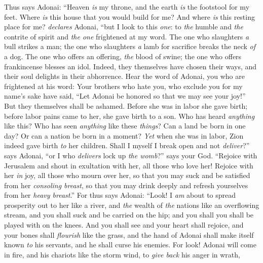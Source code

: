\begin{biblechapter} %
 Thus says Adonai:
\verse “Heaven \textit{is} my throne, 
and the earth \textit{is} the footstool for my feet. 
Where \textit{is} this house that you would build for me? 
And where \textit{is} this resting place for me? \textit{declares} Adonai, “but I look to this \textit{one}:
\verse to \textit{the} humble and \textit{the} contrite of spirit 
and \textit{the one} frightened at my word.
\verse The one who slaughters \textit{a} bull strikes a man; 
the one who slaughters \textit{a} lamb for sacrifice breaks the neck \textit{of} a dog. 
The one who offers an offering, \textit{the} blood of swine; 
the one who offers frankincense blesses an idol. 
Indeed, they themselves have chosen their ways, 
and their soul delights in their abhorrence.
\verse Hear the word of Adonai, you who are frightened at his word:
\verse Your brothers who hate you, 
who exclude you for my name’s sake have said, 
“Let Adonai be honored so that we may see your joy!” 
But they themselves shall be ashamed.
 Before she was in labor she gave birth; 
before labor pains came to her, she gave birth to a son.
\verse Who has heard \textit{anything} like this? 
Who has seen \textit{anything} like these \textit{things}? 
Can a land be born in one day? 
Or can a nation be born in a moment? \textit{Yet} when she was in labor, Zion indeed gave birth \textit{to} her children.
\verse Shall I myself I break open and not \textit{deliver}?” says Adonai, 
“or I who \textit{delivers} lock up \textit{the womb}?” says your God.
\verse “Rejoice with Jerusalem 
and shout in exultation with her, all those who love her! 
Rejoice with her \textit{in} joy, all those who mourn over her,
\verse so that you may suck and be satisfied from her \textit{consoling breast}, 
so that you may drink deeply and refresh yourselves from her \textit{heavy breast}.”
\verse For thus says Adonai:
\verse “Look! I \textit{am} about to spread prosperity out to her like a river, 
and \textit{the} wealth of \textit{the} nations like an overflowing stream, 
and you shall suck and be carried on the hip; 
and you shall you shall be played with on the knees.
 And you shall see and your heart shall rejoice, 
and your bones shall \textit{flourish} like the grass, 
and the hand of Adonai shall make itself known \textit{to} his servants, 
and he shall curse his enemies.
\verse For look! Adonai will come in fire, 
and his chariots like the storm wind, 
to \textit{give back} his anger in wrath, 

\end{biblechapter}
